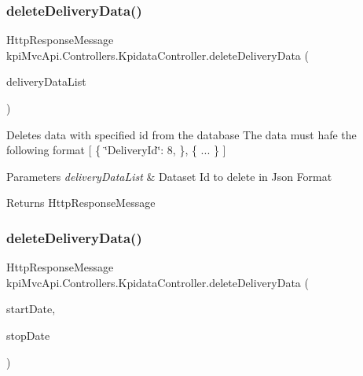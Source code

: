 \subsubsection{\texorpdfstring{delete\+Delivery\+Data()}{deleteDeliveryData()}\hspace{0.1cm}{\footnotesize\ttfamily [2/3]}}
{\footnotesize\ttfamily Http\+Response\+Message kpi\+Mvc\+Api.\+Controllers.\+Kpidata\+Controller.\+delete\+Delivery\+Data (\begin{DoxyParamCaption}\item[{List$<$ \hyperlink{classkpi_mvc_api_1_1_data_transfer_objects_1_1_delivery_data_dto}{Delivery\+Data\+Dto} $>$}]{delivery\+Data\+List }\end{DoxyParamCaption})\hspace{0.3cm}{\ttfamily [inline]}}



Deletes data with specified id from the database The data must hafe the following format \mbox{[} \{ \char`\"{}\+Delivery\+Id\char`\"{}\+: 8, \}, \{ ... \} \mbox{]} 


\begin{DoxyParams}{Parameters}
{\em delivery\+Data\+List} & Dataset Id to delete in Json Format \\
\hline
\end{DoxyParams}
\begin{DoxyReturn}{Returns}
{\ttfamily Http\+Response\+Message} 
\end{DoxyReturn}
\mbox{\label{classkpi_mvc_api_1_1_controllers_1_1_kpidata_controller_afa78742271a206304b8daa11cb747bde}} 
\subsubsection{\texorpdfstring{delete\+Delivery\+Data()}{deleteDeliveryData()}\hspace{0.1cm}{\footnotesize\ttfamily [3/3]}}
{\footnotesize\ttfamily Http\+Response\+Message kpi\+Mvc\+Api.\+Controllers.\+Kpidata\+Controller.\+delete\+Delivery\+Data (\begin{DoxyParamCaption}\item[{string}]{start\+Date,  }\item[{string}]{stop\+Date }\end{DoxyParamCaption})\hspace{0.3cm}{\ttfamily [inline]}}



